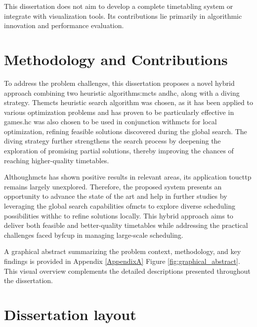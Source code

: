 This dissertation does not aim to develop a complete timetabling system or integrate with visualization tools. Its contributions lie primarily in algorithmic innovation and performance evaluation.


\section{Methodology and Contributions}

To address the problem challenges, this dissertation proposes a novel hybrid approach combining two heuristic algorithms:\ac{mcts} and\ac{hc}, along with a diving strategy. The\ac{mcts} heuristic search algorithm was chosen, as it has been applied to various optimization problems and has proven to be particularly effective in games.\ac{hc} was also chosen to be used in conjunction with\ac{mcts} for local optimization, refining feasible solutions discovered during the global search. The diving strategy further strengthens the search process by deepening the exploration of promising partial solutions, thereby improving the chances of reaching higher-quality timetables.

Although\ac{mcts} has shown positive results in relevant areas, its application to\ac{ucttp} remains largely unexplored. Therefore, the proposed system presents an opportunity to advance the state of the art and help in further studies by leveraging the global search capabilities of\ac{mcts} to explore diverse scheduling possibilities with\ac{hc} to refine solutions locally. This hybrid approach aims to deliver both feasible and better-quality timetables while addressing the practical challenges faced by\ac{fcup} in managing large-scale scheduling.

A graphical abstract summarizing the problem context, methodology, and key findings is provided in Appendix \ref{AppendixA} Figure \ref{fig:graphical_abstract}. This visual overview complements the detailed descriptions presented throughout the dissertation.

\section{Dissertation layout}

